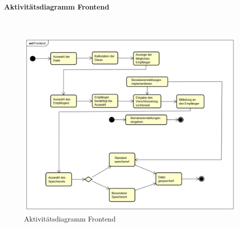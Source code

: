 \paragraph{Aktivitätsdiagramm Frontend}\mbox{}\\
\begin{figure}[H]
	\centering
	\includegraphics[width= 0.9\linewidth]{diagramms/activity/Frontend.png}
	\caption{Aktivitätsdiagramm Frontend}
\end{figure}
\newpage

